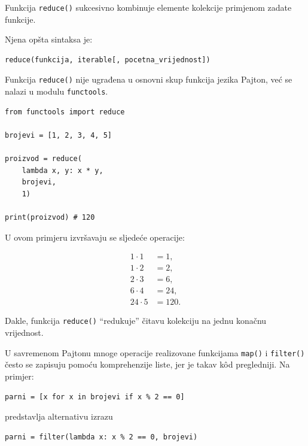 
Funkcija \texttt{reduce()} sukcesivno kombinuje elemente kolekcije primjenom zadate funkcije.

Njena opšta sintaksa je:
\begin{verbatim}
reduce(funkcija, iterable[, pocetna_vrijednost])
\end{verbatim}

Funkcija \texttt{reduce()} nije ugrađena u osnovni skup funkcija jezika Pajton, već se nalazi u modulu \texttt{functools}.

\begin{verbatim}
from functools import reduce

brojevi = [1, 2, 3, 4, 5]

proizvod = reduce(
    lambda x, y: x * y,
    brojevi,
    1)

print(proizvod) # 120
\end{verbatim}

U ovom primjeru izvršavaju se sljedeće operacije:

\begin{align*}
	1 \cdot 1 &= 1,\\
	1 \cdot 2 &= 2,\\
	2 \cdot 3 &= 6,\\
	6 \cdot 4 &= 24,\\
	24 \cdot 5 &= 120.
\end{align*}

Dakle, funkcija \texttt{reduce()} ``redukuje'' čitavu kolekciju na jednu konačnu vrijednost.


U savremenom Pajtonu mnoge operacije realizovane funkcijama \texttt{map()} i \texttt{filter()} često se zapisuju pomoću komprehenzije liste, jer je takav k\^od pregledniji. Na primjer:

\begin{verbatim}
parni = [x for x in brojevi if x % 2 == 0]
\end{verbatim}

predstavlja alternativu izrazu

\begin{verbatim}
parni = filter(lambda x: x % 2 == 0, brojevi)
\end{verbatim}

